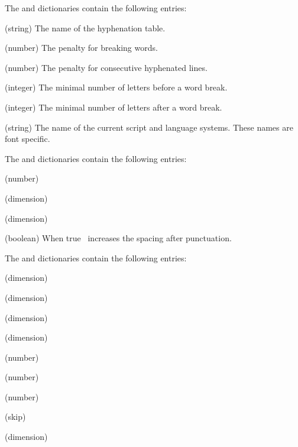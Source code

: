 The  and  dictionaries contain the following entries\?:
\begin{longdescription}
\item{\quad (string)}
  The name of the hyphenation table.
\item{\quad (number)}
  The penalty for breaking words.
\item{\quad (number)}
  The penalty for consecutive hyphenated lines.
\item{\quad (integer)}
  The minimal number of letters before a word break.
\item{\quad (integer)}
  The minimal number of letters after a word break.
\item{\quad (string)}
  The name of the current script and language systems.
  These names are font specific.
\end{longdescription}
The  and  dictionaries contain the following entries\?:
\begin{longdescription}
\item{\quad (number)}
\item{\quad (dimension)}
\item{\quad (dimension)}
\item{\quad (boolean)}
  When true \ant\ increases the spacing after punctuation.
\end{longdescription}
The  and  dictionaries contain the following entries\?:
\begin{longdescription}
\item{\quad (dimension)}
\item{\quad (dimension)}
\item{\quad (dimension)}
\item{\quad (dimension)}
\item{\quad (number)}
\item{\quad (number)}
\item{\quad (number)}
\item{\quad (skip)}
\item{\quad (dimension)}
\end{longdescription}


